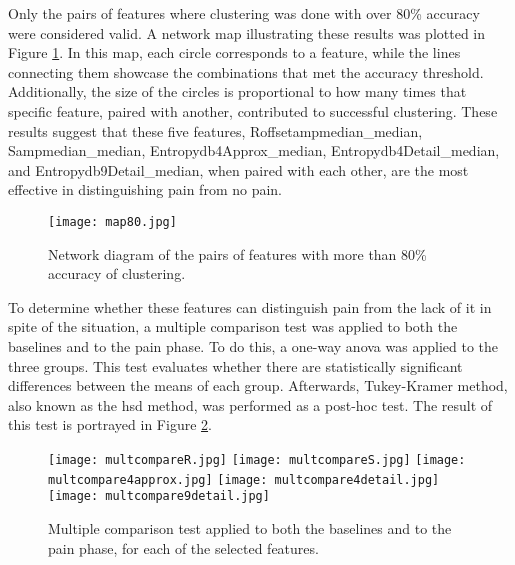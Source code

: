 Only the pairs of features where clustering was done with over 80\% accuracy were considered valid. A network map illustrating these results was plotted in Figure \ref{fig:map80}. In this map, each circle corresponds to a feature, while the lines connecting them showcase the combinations that met the accuracy threshold. Additionally, the size of the circles is proportional to how many times that specific feature, paired with another, contributed to successful clustering. These results suggest that these five features, Roffsetampmedian\_median, Sampmedian\_median, Entropydb4Approx\_median, Entropydb4Detail\_median, and Entropydb9Detail\_median, when paired with each other, are the most effective in distinguishing pain from no pain. 



\begin{figure}[h!]
    \centering
    \texttt{[image: map80.jpg]}
    \caption{Network diagram of the pairs of features with more than 80\% accuracy of clustering.}
    \label{fig:map80}
\end{figure}

To determine whether these features can distinguish pain from the lack of it in spite of the situation, a multiple comparison test was applied to both the baselines and to the pain phase. To do this, a one-way \ac{anova} was applied to the three groups. This test evaluates whether there are statistically significant differences between the means of each group. Afterwards, Tukey-Kramer method, also known as the \ac{hsd} method, was performed as a post-hoc test.
The result of this test is portrayed in Figure \ref{fig:five_images}.




\begin{figure}[htbp]
    \centering
    \texttt{[image: multcompareR.jpg]}
    \hfill
    \texttt{[image: multcompareS.jpg]}
    \vspace{0.5em}  %
    \texttt{[image: multcompare4approx.jpg]}
    \hfill
    \texttt{[image: multcompare4detail.jpg]}
    \vspace{0.5em}  %
    \texttt{[image: multcompare9detail.jpg]}
    \caption{Multiple comparison test applied to both the baselines and to the pain phase, for each of the selected features.}
    \label{fig:five_images}
\end{figure}





